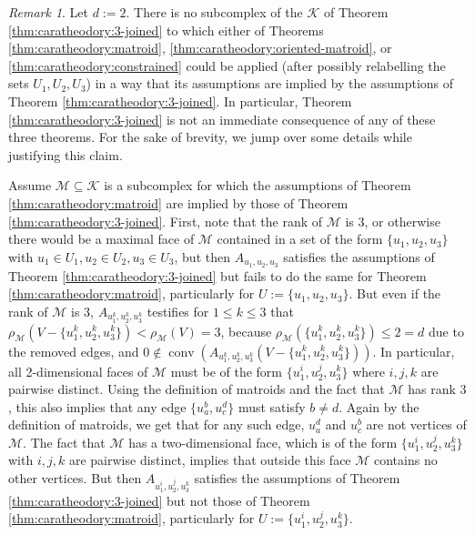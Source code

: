 \documentclass[a4paper,11pt,reqno, english]{amsart}
\theoremstyle{definition}
\theoremstyle{remark}
\newtheorem{remark}[theorem]{Remark}
\DeclareMathOperator{\conv}{\mathrm{conv}}
\begin{document}
\begin{remark}
    Let $d:=2$. There is no subcomplex of the $\mathscr{K}$ of Theorem \ref{thm:caratheodory:3-joined} to which either of Theorems \ref{thm:caratheodory:matroid}, \ref{thm:caratheodory:oriented-matroid}, or \ref{thm:caratheodory:constrained} could be applied (after possibly relabelling the sets $U_1,U_2,U_3$) in a way that its assumptions are implied by the assumptions of Theorem \ref{thm:caratheodory:3-joined}. In particular, Theorem \ref{thm:caratheodory:3-joined} is not an immediate consequence of any of these three theorems. For the sake of brevity, we jump over some details while justifying this claim.

    Assume $\mathscr{M}\subseteq\mathscr{K}$ is a subcomplex for which the assumptions of Theorem \ref{thm:caratheodory:matroid} are implied by those of Theorem \ref{thm:caratheodory:3-joined}. First, note that the rank of $\mathscr{M}$ is $3$, or otherwise there would be a maximal face of $\mathscr{M}$ contained in a set of the form $\{u_1,u_2,u_3\}$ with $u_1\in U_1,u_2\in U_2,u_3\in U_3$, but then $A_{u_1,u_2,u_3}$ satisfies the assumptions of Theorem \ref{thm:caratheodory:3-joined} but fails to do the same for Theorem \ref{thm:caratheodory:matroid}, particularly for $U:=\{u_1,u_2,u_3\}$. But even if the rank of $\mathscr{M}$ is $3$, $A_{u_1^k,u_2^k,u_3^k}$ testifies for $1\leq k\leq 3$ that $\rho_\mathscr{M}(V-\{u_1^k,u_2^k,u_3^k\})<\rho_\mathscr{M}(V)=3$, because $\rho_\mathscr{M}(\{u_1^k,u_2^k,u_3^k\})\leq 2=d$ due to the removed edges, and $0\notin\conv(A_{u_1^k,u_2^k,u_3^k}(V-\{u_1^k,u_2^k,u_3^k\}))$. In particular, all 2-dimensional faces of $\mathscr{M}$ must be of the form $\{u_1^i,u_2^j,u_3^k\}$ where $i,j,k$ are pairwise distinct. Using the definition of matroids and the fact that $\mathscr{M}$ has rank $3$, this also implies that any edge $\{u_a^b,u_c^d\}$ must satisfy $b\neq d$. Again by the definition of matroids, we get that for any such edge, $u_a^d$ and $u_c^b$ are not vertices of $\mathscr{M}$. The fact that $\mathscr{M}$ has a two-dimensional face, which is of the form $\{u_1^i,u_2^j,u_3^k\}$ with $i,j,k$ are pairwise distinct, implies that outside this face $\mathscr{M}$ contains no other vertices. But then $A_{u_1^i,u_2^j,u_3^k}$ satisfies the assumptions of Theorem \ref{thm:caratheodory:3-joined} but not those of Theorem \ref{thm:caratheodory:matroid}, particularly for $U:=\{u_1^i,u_2^j,u_3^k\}$.


\end{remark}
\end{document}
